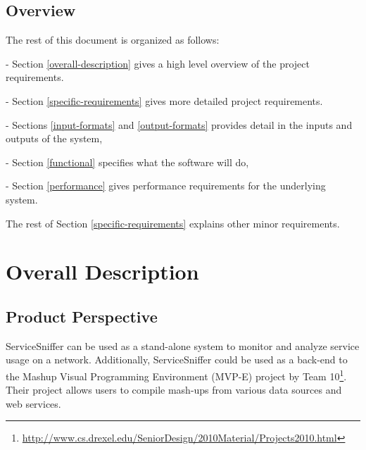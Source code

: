 \documentclass[titlepage]{article}
\begin{document}

\subsection{Overview%
  \label{overview}%
}

The rest of this document is organized as follows: 
\begin{itemize*}
\item[-]Section
\ref{overall-description} gives a high level overview of the project
requirements.  
\item[-]Section \ref{specific-requirements} gives more detailed project
requirements.  
\item[-]Sections \ref{input-formats} and \ref{output-formats} provides
detail in the inputs and outputs of the system, 
\item[-]Section \ref{functional}
specifies what the software will do, 
\item[-]Section \ref{performance} gives
performance requirements for the underlying system.
\end{itemize*}
The rest of Section
\ref{specific-requirements} explains other minor requirements.



\section{Overall Description%
  \label{overall-description}%
}


\subsection{Product Perspective%
  \label{product-perspective}%
}

ServiceSniffer can be used as a stand-alone system to monitor and analyze
service usage on a network.  Additionally, ServiceSniffer could be used as a
back-end to the Mashup Visual Programming Environment (MVP-E) project by Team
10\footnote{\url{http://www.cs.drexel.edu/SeniorDesign/2010Material/Projects2010.html}}.
Their project allows users to compile mash-ups from various data sources and
web services.


\end{document}
